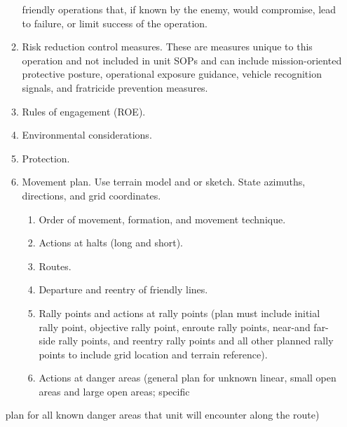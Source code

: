 \documentclass[letterpaper,tgtermes,9pt,microtype,colorlinks=true,urlcolor=blue,DIV=calc,pagesize]{scrartcl}
\begin{document}
\begin{enumerate}
\begin{enumerate}
friendly operations that, if known by the enemy, would compromise, lead to
failure, or limit success of the operation.
\item Risk reduction control measures. These are measures unique to this operation
and not included in unit SOPs and can include mission-oriented protective
posture, operational exposure guidance, vehicle recognition signals, and
fratricide prevention measures.
\item Rules of engagement (ROE).
\item Environmental considerations.
\item Protection.
\item Movement plan. Use terrain model and or sketch. State azimuths, directions, and grid coordinates.
\begin{enumerate}
\item Order of movement, formation, and movement technique.
\item Actions at halts (long and short).
\item Routes.
\item Departure and reentry of friendly lines.
\item Rally points and actions at rally points (plan must include initial rally point, objective rally point, enroute rally points, near-and far-side rally points, and reentry rally points and all other planned rally points to include grid location and terrain reference).
\item Actions at danger areas (general plan for unknown linear, small open areas and large open areas; specific
\end{enumerate}
\end{enumerate}
plan for all known danger areas that unit will encounter along the route)
\end{enumerate}
\end{document}
